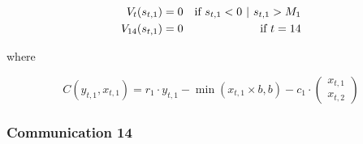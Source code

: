\documentclass{article}
\newcommand{\bs}[1]{\boldsymbol{#1}} %
\begin{document}
\begin{align}
    V_t(s_{t,1}) &= 0 & \text{if } s_{t,1} < 0 \hspace{0.125cm} | \hspace{0.125cm} s_{t,1} > M_1 \\
    V_{14}(s_{t,1}) &= 0 & \text{if } t = 14
\end{align}

where

$$C(y_{t,1}, x_{t,1}) = r_1\cdot y_{t,1}- \min\left(x_{t,1} \times b, b\right) - c_1\cdot\begin{pmatrix}x_{t,1}\\x_{t,2}\end{pmatrix}$$

\bigskip
\subsubsection{Communication 14}


\end{document}
